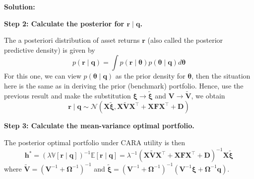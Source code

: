 \documentclass[11pt]{article}
\theoremstyle{plain} %
\newenvironment{solution}
{\color{C2}\normalfont\begin{framed}\begingroup\textbf{Solution:} }
  {\endgroup\end{framed}}
\theoremstyle{remark}
\begin{document}
\begin{solution}
\begin{enumerate}[label=(\alph*), start=2]
          \textbf{Step 2: Calculate the posterior for $\boldsymbol{r} \mid  \boldsymbol{q}$.}

          The a posteriori distribution of asset returns $\boldsymbol{r}$ (also
          called the posterior predictive density) is given by
          $$
            p(\boldsymbol{r} \mid \boldsymbol{q})=\int p(\boldsymbol{r} \mid \boldsymbol{\theta}) p(\boldsymbol{\theta} \mid \boldsymbol{q}) d \boldsymbol{\theta}
          $$
          For this one, we can view $p(\boldsymbol{\theta} \mid \boldsymbol{q})$
          as the prior density for $\boldsymbol{\theta}$, then the situation
          here is the same as in deriving the prior (benchmark) portfolio.
          Hence, use the previous result and make the substitution
          $\boldsymbol{\xi} \rightarrow \widetilde{\boldsymbol{\xi}}$ and
          $\boldsymbol{V} \rightarrow \widetilde{\boldsymbol{V}}$, we obtain
          $$
            \boldsymbol{r} \mid \boldsymbol{q} \sim \mathcal{N}\left(\boldsymbol{X}\widetilde{\boldsymbol{\xi}}, \boldsymbol{X}\boldsymbol{\widetilde{V}}\boldsymbol{X}^\top + \boldsymbol{X}\boldsymbol{F}\boldsymbol{X}^\top + \boldsymbol{D}\right)
          $$

          \textbf{Step 3: Calculate the mean-variance optimal portfolio.}

          The posterior optimal portfolio under CARA utility is then
          $$
            \boldsymbol{h}^*
            =\left(\lambda \mathbb{V}[\boldsymbol{r}\mid \boldsymbol{q}]\right)^{-1} \mathbb{E}[\boldsymbol{r}\mid \boldsymbol{q}]
            =\lambda^{-1} \left(\boldsymbol{X}\boldsymbol{\widetilde{V}}\boldsymbol{X}^\top + \boldsymbol{X}\boldsymbol{F}\boldsymbol{X}^\top + \boldsymbol{D}\right)^{-1} \boldsymbol{X}\boldsymbol{\widetilde{\xi}}
          $$
          where
          $\widetilde{\boldsymbol{V}}=\left(\boldsymbol{V}^{-1}+\boldsymbol{\Omega}^{-1}\right)^{-1}$
          and $\widetilde{\boldsymbol{\xi}}=\left(\boldsymbol{V}^{-1}+\boldsymbol{\Omega}^{-1}\right)^{-1}\left(\boldsymbol{V}^{-1}
            \boldsymbol{\xi}+\boldsymbol{\Omega}^{-1} \boldsymbol{q}\right)$.
  \end{enumerate}
\end{solution}
\end{document}

